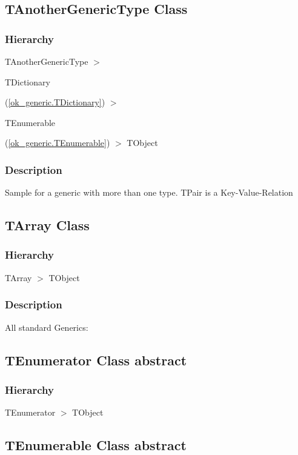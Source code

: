 \documentclass{report}
\begin{document}
\subsection*{TAnotherGenericType Class}
\subsubsection*{\large{\textbf{Hierarchy}}\normalsize\hspace{1ex}\hfill}
TAnotherGenericType {$>$} \begin{ttfamily}TDictionary\end{ttfamily}(\ref{ok_generic.TDictionary}) {$>$} \begin{ttfamily}TEnumerable\end{ttfamily}(\ref{ok_generic.TEnumerable}) {$>$} 
TObject
\subsubsection*{\large{\textbf{Description}}\normalsize\hspace{1ex}\hfill}
Sample for a generic with more than one type. TPair is a Key{-}Value{-}Relation\subsection*{TArray Class}
\subsubsection*{\large{\textbf{Hierarchy}}\normalsize\hspace{1ex}\hfill}
TArray {$>$} TObject
\subsubsection*{\large{\textbf{Description}}\normalsize\hspace{1ex}\hfill}
All standard Generics:\subsection*{TEnumerator Class abstract}
\subsubsection*{\large{\textbf{Hierarchy}}\normalsize\hspace{1ex}\hfill}
TEnumerator {$>$} TObject
\subsection*{TEnumerable Class abstract}
\end{document}
